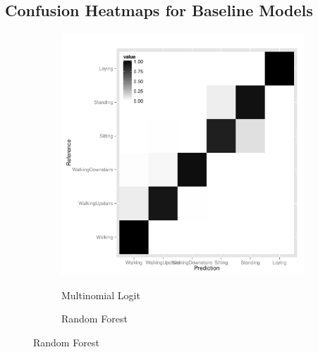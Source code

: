 \begin{appendices}

\clearpage
\section{Confusion Heatmaps for Baseline Models}

\begin{figure}[!htb]
  \centering
  \caption{Confusion Matrix Heatmaps for Baseline Predictive Models}
  \begin{subfigure}[b]{0.49\textwidth}
    \caption{Multinomial Logit}
    \includegraphics[width=\textwidth]{heatmap_dmr.pdf}
    \label{fig:heatmap_dmr}
  \end{subfigure}
  \hfill
  \begin{subfigure}[b]{0.49\textwidth}
    \caption{Random Forest}

\end{subfigure}
\end{figure}
\end{appendices}
